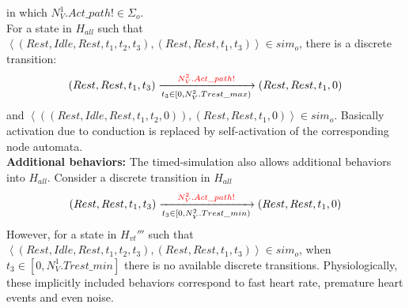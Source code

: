 in which $N^1_V.Act\_path!\in\Sigma_o$. \\
For a state in $H_{all}$ such that $\left\langle (Rest,Idle,Rest,t_1,t_2,t_3) ,(Rest,Rest,t_1,t_3)\right\rangle\in sim_o$,  there is a discrete transition:
$$(Rest,Rest,t_1,t_3)\xrightarrow[t_3\in [0, N^2_V.Trest\_max)]{\textcolor{red}{N^2_V.Act\_path!}}(Rest,Rest,t_1,0)$$
and $\left\langle ((Rest,Idle,Rest,t_1,t_2,0)),(Rest,Rest,t_1,0)\right\rangle\in sim_o$. Basically activation due to conduction is replaced by self-activation of the corresponding node automata.\\
\textbf{Additional behaviors: }The timed-simulation also allows additional behaviors into $H_{all}$. Consider a discrete transition in $H_{all}$
$$(Rest,Rest,t_1,t_3)\xrightarrow[t_3\in [0, N^2_V.Trest\_min)]{\textcolor{red}{N^2_V.Act\_path!}}(Rest,Rest,t_1,0)$$
However, for a state in $H_{vt}'''$ such that $\left\langle (Rest,Idle,Rest,t_1,t_2,t_3),(Rest,Rest,t_1,t_3)\right\rangle\in sim_o$, when $t_3\in [0, N^1_V.Trest\_min]$ there is no available discrete transitions. Physiologically, these implicitly included behaviors correspond to fast heart rate, premature heart events and even noise.


%





